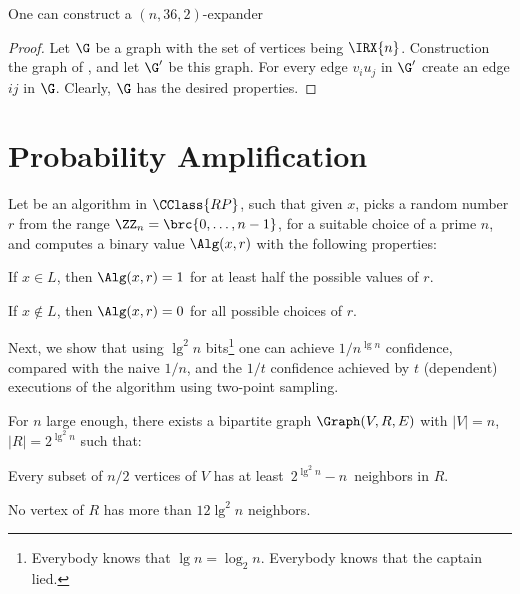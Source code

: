 \begin{theorem}
    One can construct a $(n,36,2)$-expander 
\end{theorem}
\begin{proof}
    Let $\G$ be a graph with the set of vertices being $\IRX{n}$.
    Construction the graph of , and let $\G'$ be
    this graph. For every edge $v_i u_j$ in $\G'$ create an edge $ ij$
    in $\G$. Clearly, $\G$ has the desired properties.
\end{proof}


\section{Probability Amplification}

Let \Alg be an algorithm in $\CClass{RP}$, such that given $x$, \Alg
picks a random number $r$ from the range $\ZZ_n =\brc{0,\ldots, n-1}$,
for a suitable choice of a prime $n$, and computes a binary value
$\Alg(x,r)$ with the following properties:
\begin{compactenumA}
    \item If $x \in L$, then $\Alg(x,r)=1$ for at least half the
    possible values of $r$.
    
    \item If $x \notin L$, then $\Alg(x,r) = 0$ for all possible
    choices of $r$.
\end{compactenumA}

\medskip

Next, we show that using $\lg^2 n$ bits\footnote{Everybody knows that
   $\lg n =\log_2 n$. Everybody knows that the captain lied.}  one can
achieve $1/n^{\lg n}$ confidence, compared with the naive $1/n$, and
the $1/t$ confidence achieved by $t$ (dependent) executions of the
algorithm using two-point sampling.

\begin{theorem}%
    For $n$ large enough, there exists a bipartite graph
    $\Graph(V,R,E)$ with $|V|=n$, $|R|= 2^{\lg^2 n}$ such that:
    \begin{compactenumi}
        \item Every subset of $n/2$ vertices of $V$ has at least
        $\,{2^{\lg^2 n} -n}\,$ neighbors in $R$.
        
        \item No vertex of $R$ has more than $12 \lg^2 n$ neighbors.
    \end{compactenumi}
\end{theorem}


